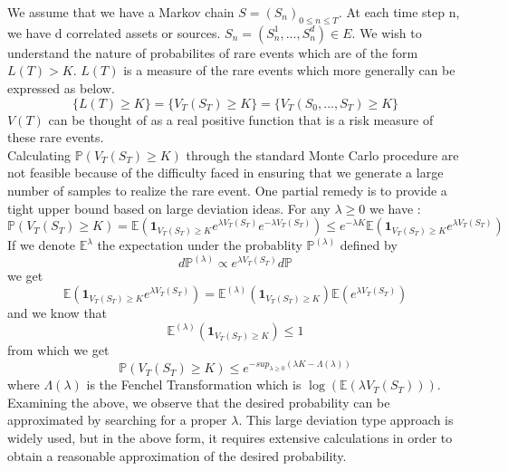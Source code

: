 We assume that we have a Markov chain $S=(S_n)_{0 \leq n \leq T}$. At each time step n, we have d correlated assets or sources. $S_n = (S_n^1,...,S_n^d) \in \mathit{E}$. We wish to understand the nature of probabilites of rare events which are of the form $L(T) > K$. $L(T)$ is a measure of the rare events which more generally can be expressed as below.
$$
\{L(T) \geq K\} = \{V_T(S_T)\geq K\} = \{V_T(S_0,...,S_T)\geq K\}
$$
$V(T)$ can be thought of as a real positive function that is a risk measure of these rare events.\\
Calculating $\mathbb{P}(V_T(S_T) \geq K)$ through the standard Monte Carlo procedure are not feasible because of the difficulty faced in ensuring that we generate a large number of samples to realize the rare event. One partial remedy is to provide a tight upper bound based on large deviation ideas. For any $\lambda \geq 0$ we have :
\begin{equation}
\mathbb{P}(V_T(S_T)\geq K) = \mathbb{E}\left( \mathbf{1}_{V_T(S_T)\geq K} e^{\lambda V_T(S_T)} e^{-\lambda V_T(S_T)} \right) \leq
e^{-\lambda K}\mathbb{E}\left( \mathbf{1}_{V_T(S_T)\geq K}e^{\lambda V_T(S_T)} \right)
\end{equation}
If we denote $\mathbb{E^{\lambda}}$ the expectation under the probablity $\mathbb{P}^{(\lambda)}$ defined by
$$d\mathbb{P}^{(\lambda)} \propto e^{\lambda V_T(S_T)}d\mathbb{P}$$
we get 
$$\mathbb{E}\left( \mathbf{1}_{V_T(S_T)\geq K}e^{\lambda V_T(S_T)}  \right) = \mathbb{E}^{(\lambda)}\left(\mathbf{1}_{V_T(S_T)\geq K}\right)\mathbb{E}\left(e^{\lambda V_T(S_T)}\right)$$
and we know that
$$\mathbb{E}^{(\lambda)}\left(\mathbf{1}_{V_T(S_T)\geq K}\right)\leq 1 $$
from which we get
\begin{equation}
\mathbb{P}\left(V_T(S_T) \geq K\right) \leq e^{-sup_{\lambda\geq 0}(\lambda K - \Lambda(\lambda))}
\end{equation}
where $\Lambda(\lambda)$ is the Fenchel Transformation which is $\log (\mathbb{E}(\lambda V_T(S_T)))$.\\
Examining the above, we observe that the desired probability can be approximated by searching for a proper $\lambda$. This large deviation type approach is widely used, but in the above form, it requires extensive calculations in order to obtain a reasonable approximation of the desired probability.\\

